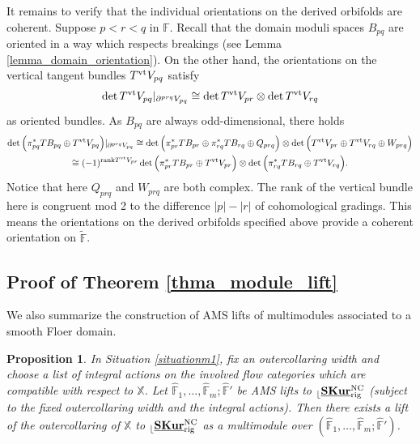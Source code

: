 \documentclass[reqno, 10pt]{amsart}
\numberwithin{equation}{section}
\numberwithin{equation}{section}
\newtheorem{prop}[thm]{Proposition}
\theoremstyle{definition}
\theoremstyle{remark}
\newcommand{\beqn}{\begin{equation*}}
\newcommand{\eeqn}{\end{equation*}}
\newcommand{\mb}{\mathbb}
\renewcommand{\outer}{{}_{\lfloor}}
\newcommand{\uds}[1]{\underline{\smash{#1}}}
\begin{document}
It remains to verify that the individual orientations on the derived orbifolds are coherent. Suppose $p<r<q$ in ${\mb F}$. Recall that the domain moduli spaces $B_{pq}$ are oriented in a way which respects breakings (see Lemma \ref{lemma_domain_orientation}). On the other hand, the orientations on the vertical tangent bundles $T^{\rm vt} V_{pq}$ satisfy 
\beqn
\det T^{\rm vt} V_{pq}|_{\partial^{prq} V_{pq}} \cong \det T^{\rm vt} V_{pr} \otimes \det T^{\rm vt} V_{rq}
\eeqn
as oriented bundles. As $B_{pq}$ are always odd-dimensional, there holds
\begin{multline*}
\det \Big( \pi_{pq}^* TB_{pq} \oplus T^{\rm vt} V_{pq}\Big)|_{\partial^{prq} V_{pq}} \cong \det \Big( \pi_{pr}^* TB_{pr} \oplus \pi_{rq}^* TB_{rq} \oplus Q_{prq} \Big) \otimes \det \Big( T^{\rm vt} V_{pr} \oplus T^{\rm vt} V_{rq} \oplus W_{prq} \Big) \\
\cong (-1)^{{\rm rank} T^{\rm vt} V_{pr}} \det \Big( \pi_{pr}^* TB_{pr} \oplus T^{\rm vt} V_{pr} \Big)  \otimes \det \Big( \pi_{rq}^* TB_{rq}\oplus T^{\rm vt} V_{rq}  \Big).
\end{multline*}
Notice that here $Q_{prq}$ and $W_{prq}$ are both complex. The rank of the vertical bundle here is congruent mod 2 to the difference $|p| - |r|$ of cohomological gradings. This means the orientations on the derived orbifolds specified above provide a coherent orientation on $\tilde {\mb F}$.



\subsection{Proof of Theorem \ref{thma_module_lift}}

We also summarize the construction of AMS lifts of multimodules associated to a smooth Floer domain.

\begin{prop}\label{prop181}
In Situation \ref{situationm1}, fix an outercollaring width and choose a list of integral actions on the involved flow categories which are compatible with respect to ${\mb X}$. Let $\hat {\mb F}_1, \ldots, \hat{\mb F}_m; \hat {\mb F}'$ be AMS lifts to $\outer \uds{\bf SKur}_{\rm rig}^{\rm NC}$ (subject to the fixed outercollaring width and the integral actions). Then there exists a lift of the outercollaring of ${\mb X}$ to $\outer \uds{\bf SKur}_{\rm rig}^{\rm NC}$ as a multimodule over $(\hat{\mb F}_1, \ldots, \hat{\mb F}_m; \hat{\mb F}')$.
\end{prop}
\end{document}
